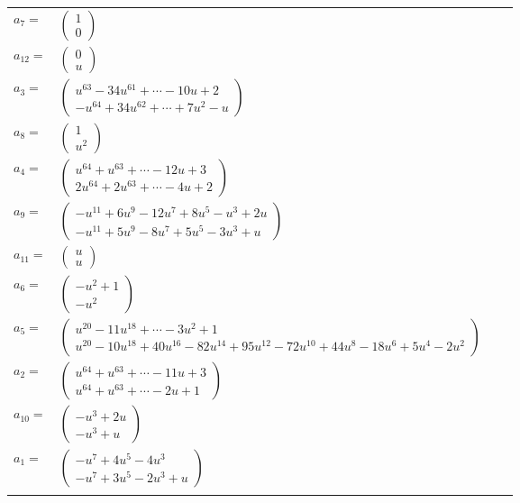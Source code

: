 \documentclass[1p]{elsarticle_modified}
\theoremstyle{definition}
\begin{document}
\begin{tabular}{m{7pt} m{180pt} m{7pt} m{180pt} }
\flushright $a_{7}=$&$\begin{pmatrix}1\\0\end{pmatrix}$ \\
\flushright $a_{12}=$&$\begin{pmatrix}0\\u\end{pmatrix}$ \\
\flushright $a_{3}=$&$\begin{pmatrix}u^{63}-34 u^{61}+\cdots-10 u+2\\- u^{64}+34 u^{62}+\cdots+7 u^2- u\end{pmatrix}$ \\
\flushright $a_{8}=$&$\begin{pmatrix}1\\u^2\end{pmatrix}$ \\
\flushright $a_{4}=$&$\begin{pmatrix}u^{64}+u^{63}+\cdots-12 u+3\\2 u^{64}+2 u^{63}+\cdots-4 u+2\end{pmatrix}$ \\
\flushright $a_{9}=$&$\begin{pmatrix}- u^{11}+6 u^9-12 u^7+8 u^5- u^3+2 u\\- u^{11}+5 u^9-8 u^7+5 u^5-3 u^3+u\end{pmatrix}$ \\
\flushright $a_{11}=$&$\begin{pmatrix}u\\u\end{pmatrix}$ \\
\flushright $a_{6}=$&$\begin{pmatrix}- u^2+1\\- u^2\end{pmatrix}$ \\
\flushright $a_{5}=$&$\begin{pmatrix}u^{20}-11 u^{18}+\cdots-3 u^2+1\\u^{20}-10 u^{18}+40 u^{16}-82 u^{14}+95 u^{12}-72 u^{10}+44 u^8-18 u^6+5 u^4-2 u^2\end{pmatrix}$ \\
\flushright $a_{2}=$&$\begin{pmatrix}u^{64}+u^{63}+\cdots-11 u+3\\u^{64}+u^{63}+\cdots-2 u+1\end{pmatrix}$ \\
\flushright $a_{10}=$&$\begin{pmatrix}- u^3+2 u\\- u^3+u\end{pmatrix}$ \\
\flushright $a_{1}=$&$\begin{pmatrix}- u^7+4 u^5-4 u^3\\- u^7+3 u^5-2 u^3+u\end{pmatrix}$\\&\end{tabular}
\end{document}
